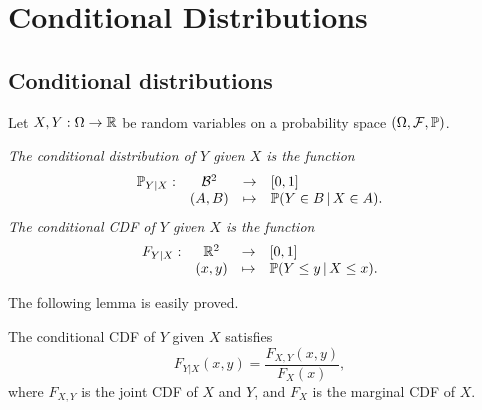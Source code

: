\chapter{Conditional Distributions}\label{chap:cond_dist}
\section{Conditional distributions}
Let $X,Y:\Omega\to\mathbb{R}$ be random variables on a probability space $(\Omega,\mathcal{F},\mathbb{P})$.

\begin{definition}
\ben
\it %
The \emph{conditional distribution} of $Y$ given $X$ is the function
\[
\begin{array}{cccl}
\mathbb{P}_{Y|X}:		& \mathcal{B}^2	& \to		& [0,1] \\
				& (A,B)			& \mapsto	& \mathbb{P}(Y\in B\,|\, X\in A).
\end{array}
\]
\it The \emph{conditional CDF} of $Y$ given $X$ is the function
\[
\begin{array}{cccl}
F_{Y|X}:		& \mathbb{R}^2	& \to		& [0,1] \\
			& (x,y)	& \mapsto	& \mathbb{P}(Y\leq y\,|\, X\leq x).
\end{array}
\]
\een
\end{definition}

The following lemma is easily proved.
\begin{lemma} 
The conditional CDF of $Y$ given $X$ satisfies
\[
F_{Y|X}(x,y) = \frac{F_{X,Y}(x,y)}{F_X(x)},
\]
where $F_{X,Y}$ is the joint CDF of $X$ and $Y$, and $F_X$ is the marginal CDF of $X$.
\end{lemma}


